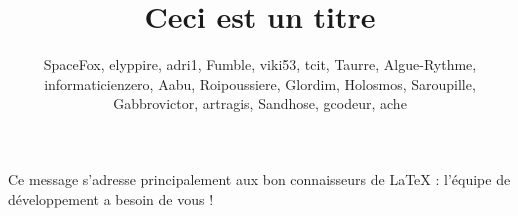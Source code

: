 \documentclass[small]{zmdocument}
\title{Ceci est un titre}
\author{SpaceFox, elyppire, adri1, Fumble, viki53, tcit, Taurre, Algue-Rythme, informaticienzero, Aabu, Roipoussiere, Glordim, Holosmos, Saroupille, Gabbrovictor, artragis, Sandhose, gcodeur, ache}
\begin{document}
\maketitle
\tableofcontents
\newpage

\begin{LevelOneIntroduction}
Ce message s’adresse principalement aux bon connaisseurs de LaTeX : l’équipe de développement a besoin de vous ! 
\end{LevelOneIntroduction}
\end{document}
